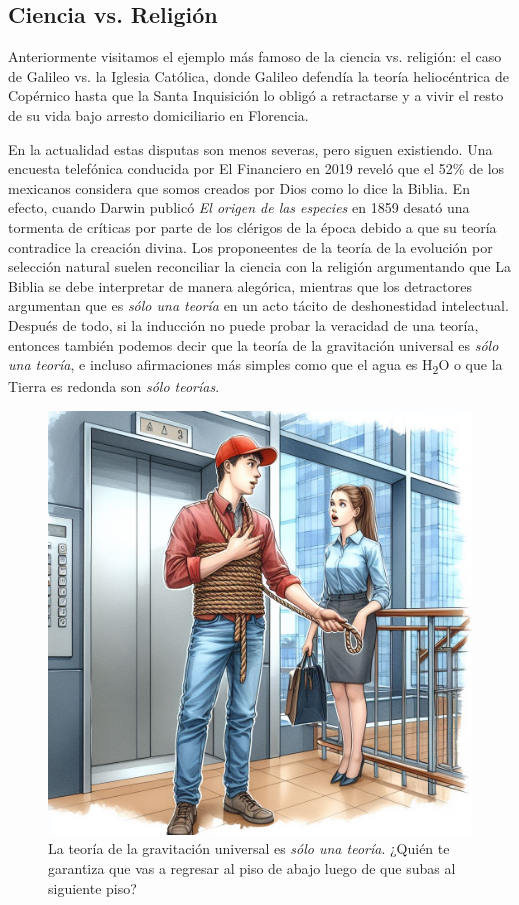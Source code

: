 \subsection*{Ciencia vs. Religión}
\label{sub:cienciavsreligion}
Anteriormente visitamos el ejemplo más famoso de la ciencia vs. religión: el
caso de Galileo vs. la Iglesia Católica, donde Galileo defendía la teoría
heliocéntrica de Copérnico hasta que la Santa Inquisición lo obligó a
retractarse y a vivir el resto de su vida bajo arresto domiciliario en
Florencia.

En la actualidad estas disputas son menos severas, pero siguen existiendo.
Una encuesta telefónica conducida por El Financiero\cite{Moreno2019} en 2019
reveló que el 52\% de los mexicanos considera que somos creados por Dios
como lo dice la Biblia.
En efecto, cuando Darwin publicó \emph{El origen de las especies} en 1859
desató una tormenta de críticas por parte de los clérigos de la época debido a
que su teoría contradice la creación divina.
Los proponeentes de la teoría de la evolución por selección natural suelen
reconciliar la ciencia con la religión argumentando que La Biblia se debe
interpretar de manera alegórica, mientras que los detractores argumentan que
es \emph{sólo una teoría} en un acto tácito de deshonestidad intelectual.
Después de todo, si la inducción no puede probar la veracidad de una teoría,
entonces también podemos decir que la teoría de la gravitación universal es
\emph{sólo una teoría}, e incluso afirmaciones más simples como que el agua
es H\textsubscript{2}O o que la Tierra es redonda son \emph{sólo teorías}.

\begin{figure}[ht]
    \centering
    \includegraphics[width=0.8\linewidth]{img/gravedadesteoria}
    \caption{La teoría de la gravitación universal es \emph{sólo una teoría}.
        ¿Quién te garantiza que vas a regresar al piso de abajo luego de que
        subas al siguiente piso?}
\end{figure}

